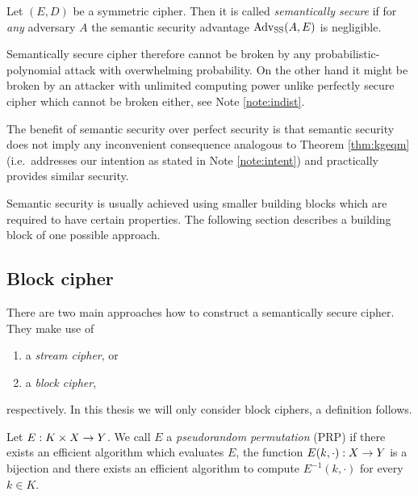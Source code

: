 \begin{defn}
\label{def:semsec}
	Let $(E,D)$ be a symmetric cipher. Then it is called {\em semantically secure} if for {\em any} adversary $A$ the semantic security advantage $\operatorname*{Adv_{SS}}(A,E)$ is negligible.
\end{defn}


Semantically secure cipher therefore cannot be broken by any probabilistic-polynomial attack with overwhelming probability. On the other hand it might be broken by an attacker with unlimited computing power unlike perfectly secure cipher which cannot be broken either, see Note \ref{note:indist}.

The benefit of semantic security over perfect security is that semantic security does not imply any inconvenient consequence analogous to Theorem \ref{thm:kgeqm} (i.e.\ addresses our intention as stated in Note \ref{note:intent}) and practically provides similar security.

Semantic security is usually achieved using smaller building blocks which are required to have certain properties. The following section describes a building block of one possible approach.


\subsection{Block cipher}

There are two main approaches how to construct a semantically secure cipher. They make use of
\begin{enumerate}
	\item a {\em stream cipher}, or
	\item a {\em block cipher},
\end{enumerate}
respectively. In this thesis we will only consider block ciphers, a definition follows.

\begin{defn}
\label{def:prp}
	Let $E: K\times X\rightarrow Y$. We call $E$ a {\em pseudorandom permutation} (PRP) if there exists an efficient algorithm which evaluates $E$, the function $E(k,\cdot): X\rightarrow Y$ is a bijection and there exists an efficient algorithm to compute $E^{-1}(k,\cdot)$ for every $k\in K$.
\end{defn}

